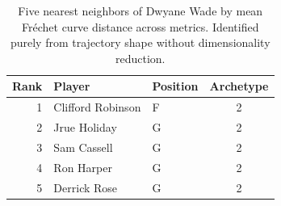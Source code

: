 \begin{table}[htbp]
  \centering\small
  \begin{tabular}{rllc}
    \toprule
    Rank & Player & Position & Archetype \\
    \midrule
    1 & Clifford Robinson & F & 2 \\
    2 & Jrue Holiday & G & 2 \\
    3 & Sam Cassell & G & 2 \\
    4 & Ron Harper & G & 2 \\
    5 & Derrick Rose & G & 2 \\
    \bottomrule
  \end{tabular}
  \caption{Five nearest neighbors of Dwyane Wade by mean Fr\'{e}chet curve distance across metrics. Identified purely from trajectory shape without dimensionality reduction.}
  \label{tab:Dwyane_Wade_frechet_curve_neighbors}
\end{table}

